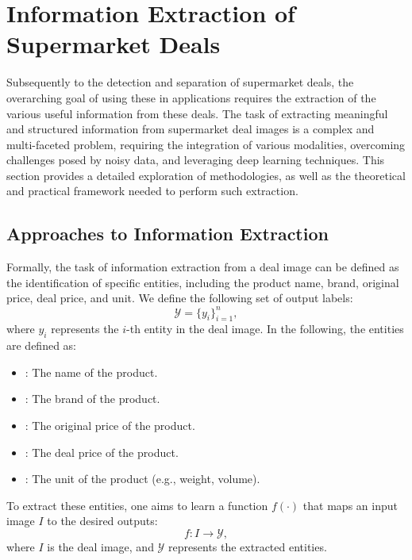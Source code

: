 \documentclass[11pt]{article}
\begin{document}
\section{Information Extraction of Supermarket Deals}
Subsequently to the detection and separation of supermarket deals, the overarching goal of using these in applications requires the extraction of the various useful information from these deals. 
The task of extracting meaningful and structured information from supermarket deal images is a complex and multi-faceted problem, requiring the integration of various modalities, overcoming challenges posed by noisy data, and leveraging deep learning techniques. This section provides a detailed exploration of methodologies, as well as the theoretical and practical framework needed to perform such extraction.

\subsection{Approaches to Information Extraction}
Formally, the task of information extraction from a deal image can be defined as the identification of specific entities, including the product name, brand, original price, deal price, and unit. We define the following set of output labels:
\begin{equation}
\mathcal{Y} = \{y_{i}\}_{i=1}^{n},
\end{equation}
where $y_{i}$ represents the $i$-th entity in the deal image. In the following, the entities are defined as:
\begin{itemize}
    \item {}: The name of the product.
    \item {}: The brand of the product.
    \item {}: The original price of the product.
    \item {}: The deal price of the product.
    \item {}: The unit of the product (e.g., weight, volume).
\end{itemize}

To extract these entities, one aims to learn a function $f(\cdot)$ that maps an input image $I$ to the desired outputs:
\begin{equation}
    f: I \to \mathcal{Y},
\end{equation}
where $ I $ is the deal image, and $ \mathcal{Y} $ represents the extracted entities.
\end{document}
